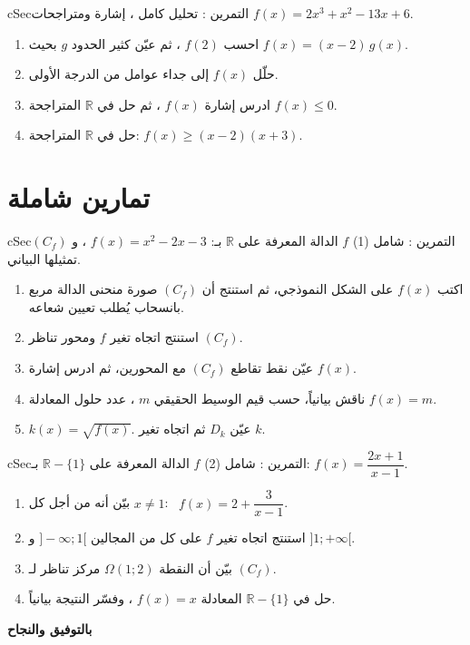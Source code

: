 \documentclass[12pt,a4paper]{article}
\newenvironment{BOX}[2]{\begin{otherlanguage}{english}\begin{arbox}{#1}{#2}}{\end{arbox}\end{otherlanguage}}
\newcounter{exo}
\newenvironment{tamrin}[1]{\stepcounter{exo}\begin{BOX}{cSec}{التمرين \theexo: #1}}{\end{BOX}}
\newcommand{\R}{\mathbb{R}}
\begin{document}
\begin{tamrin}{تحليل كامل ، إشارة ومتراجحات}
$f(x)=2x^3+x^2-13x+6$.
\begin{enumerate}
\item احسب $f(2)$ ، ثم عيّن كثير الحدود $g$ بحيث $f(x)=(x-2)\,g(x)$.
\item حلّل $f(x)$ إلى جداء عوامل من الدرجة الأولى.
\item ادرس إشارة $f(x)$ ، ثم حل في $\R$ المتراجحة $f(x)\le0$.
\item حل في $\R$ المتراجحة: $f(x)\ge(x-2)(x+3)$.
\end{enumerate}
\end{tamrin}

\section{تمارين شاملة}
\begin{tamrin}{شامل (1)}
$f$ الدالة المعرفة على $\R$ بـ: $f(x)=x^2-2x-3$ ، و $(C_f)$ تمثيلها البياني.
\begin{enumerate}
\item اكتب $f(x)$ على الشكل النموذجي، ثم استنتج أن $(C_f)$ صورة منحنى الدالة مربع بانسحاب يُطلب تعيين شعاعه.
\item استنتج اتجاه تغير $f$ ومحور تناظر $(C_f)$.
\item عيّن نقط تقاطع $(C_f)$ مع المحورين، ثم ادرس إشارة $f(x)$.
\item ناقش بيانياً، حسب قيم الوسيط الحقيقي $m$ ، عدد حلول المعادلة $f(x)=m$.
\item $k(x)=\sqrt{f(x)}$. عيّن $D_k$ ثم اتجاه تغير $k$.
\end{enumerate}
\end{tamrin}

\begin{tamrin}{شامل (2)}
$f$ الدالة المعرفة على $\R-\{1\}$ بـ: $f(x)=\dfrac{2x+1}{x-1}$.
\begin{enumerate}
\item بيّن أنه من أجل كل $x\ne1$: \ $f(x)=2+\dfrac{3}{x-1}$.
\item استنتج اتجاه تغير $f$ على كل من المجالين $]-\infty;1[$ و $]1;+\infty[$.
\item بيّن أن النقطة $\Omega(1;2)$ مركز تناظر لـ $(C_f)$.
\item حل في $\R-\{1\}$ المعادلة $f(x)=x$ ، وفسّر النتيجة بيانياً.
\end{enumerate}
\end{tamrin}

\vfill
\begin{center}
{\color{cSec}\large\bfseries بالتوفيق والنجاح}
\end{center}
\end{document}
